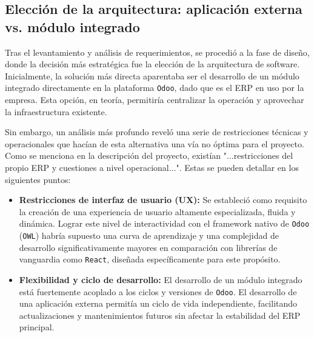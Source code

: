 \documentclass[12pt,letterpaper,spanish]{report}
\begin{document}
\subsection{Elección de la arquitectura: aplicación externa vs. módulo integrado}
\label{sec:eleccion_arquitectura}

Tras el levantamiento y análisis de requerimientos, se procedió a la fase de diseño, donde la decisión más estratégica fue la elección de la arquitectura de software. Inicialmente, la solución más directa aparentaba ser el desarrollo de un módulo integrado directamente en la plataforma \texttt{Odoo}, dado que es el ERP en uso por la empresa. Esta opción, en teoría, permitiría centralizar la operación y aprovechar la infraestructura existente.

Sin embargo, un análisis más profundo reveló una serie de restricciones técnicas y operacionales que hacían de esta alternativa una vía no óptima para el proyecto. Como se menciona en la descripción del proyecto, existían "...restricciones del propio ERP y cuestiones a nivel operacional...". Estas se pueden detallar en los siguientes puntos:

\begin{itemize}
    \item \textbf{Restricciones de interfaz de usuario (UX):} Se estableció como requisito la creación de una experiencia de usuario altamente especializada, fluida y dinámica. Lograr este nivel de interactividad con el framework nativo de \texttt{Odoo} (\texttt{OWL}) habría supuesto una curva de aprendizaje y una complejidad de desarrollo significativamente mayores en comparación con librerías de vanguardia como \texttt{React}, diseñada específicamente para este propósito.

    \item \textbf{Flexibilidad y ciclo de desarrollo:} El desarrollo de un módulo integrado está fuertemente acoplado a los ciclos y versiones de \texttt{Odoo}. El desarrollo de una aplicación externa permitía un ciclo de vida independiente, facilitando actualizaciones y mantenimientos futuros sin afectar la estabilidad del ERP principal.

\end{itemize}
\end{document}
